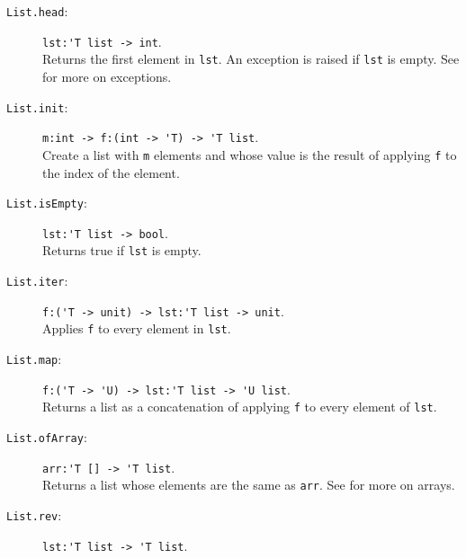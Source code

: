 \documentclass[fsharpNotes.tex]{subfiles}
\begin{document}
\begin{description}
\item[\texttt{List.head}:] \lstinline{lst:'T list -> int}.~\\
  Returns the first element in \lstinline{lst}. An exception is raised if \lstinline{lst} is empty. See  for more on exceptions.
\item[\texttt{List.init}:] \lstinline{m:int -> f:(int -> 'T) -> 'T list}.~\\
  Create a list with \lstinline{m} elements and whose value is the result of applying \lstinline{f} to the index of the element.
\item[\texttt{List.isEmpty}:]  \lstinline{lst:'T list -> bool}.~\\
  Returns true if \lstinline{lst} is empty.
\item[\texttt{List.iter}:] \lstinline{f:('T -> unit) -> lst:'T list -> unit}.~\\
  Applies \lstinline{f} to every element in \lstinline{lst}.
\item[\texttt{List.map}:] \lstinline{f:('T -> 'U) -> lst:'T list -> 'U list}.~\\
  Returns a list as a concatenation of applying \lstinline{f} to every element of \lstinline{lst}.
\item[\texttt{List.ofArray}:] \lstinline{arr:'T [] -> 'T list}.~\\
  Returns a list whose elements are the same as \lstinline{arr}. See  for more on arrays.
\item[\texttt{List.rev}:] \lstinline{lst:'T list -> 'T list}.~\\

\end{description}
\end{document}

